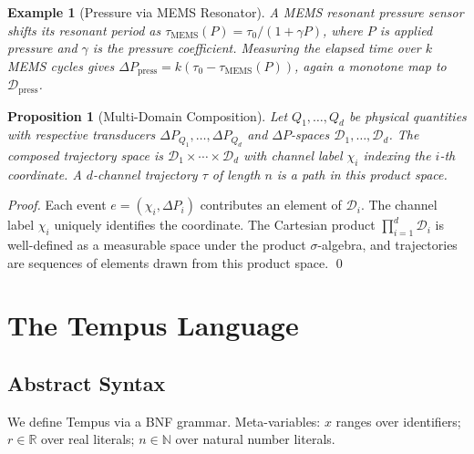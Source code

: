 \documentclass[twocolumn,10pt]{article}
\newtheorem{proposition}[theorem]{Proposition}
\newtheorem{example}[theorem]{Example}
\newcommand{\DP}{\Delta P}          %
\newcommand{\calD}{\mathcal{D}}     %
\begin{document}
\begin{example}[Pressure via MEMS Resonator]
\label{ex:press}
A MEMS resonant pressure sensor shifts its resonant period as
$\tau_{\mathrm{MEMS}}(P) = \tau_0 / (1 + \gamma P)$,
where $P$ is applied pressure and $\gamma$ is the pressure
coefficient. Measuring the elapsed time over $k$ MEMS cycles
gives $\DP_{\mathrm{press}} = k(\tau_0 - \tau_{\mathrm{MEMS}}(P))$,
again a monotone map to $\calD_{\mathrm{press}}$.
\end{example}

\begin{proposition}[Multi-Domain Composition]
\label{prop:multidom}
Let $Q_1, \ldots, Q_d$ be physical quantities with respective
transducers $\DP_{Q_1}, \ldots, \DP_{Q_d}$ and $\DP$-spaces
$\calD_1, \ldots, \calD_d$. The \emph{composed trajectory space} is
$\calD_1 \times \cdots \times \calD_d$ with channel label
$\chi_i$ indexing the $i$-th coordinate. A $d$-channel trajectory
$\tau$ of length $n$ is a path in this product space.
\end{proposition}
\begin{proof}
Each event $e = (\chi_i, \DP_i)$ contributes an element of $\calD_i$.
The channel label $\chi_i$ uniquely identifies the coordinate.
The Cartesian product $\prod_{i=1}^{d} \calD_i$ is well-defined as a
measurable space under the product $\sigma$-algebra, and trajectories
are sequences of elements drawn from this product space. \qed
\end{proof}

\section{The Tempus Language}
\label{sec:tempus}

\subsection{Abstract Syntax}

We define Tempus via a BNF grammar. Meta-variables: $x$ ranges over
identifiers; $r \in \mathbb{R}$ over real literals; $n \in \mathbb{N}$
over natural number literals.
\end{document}
